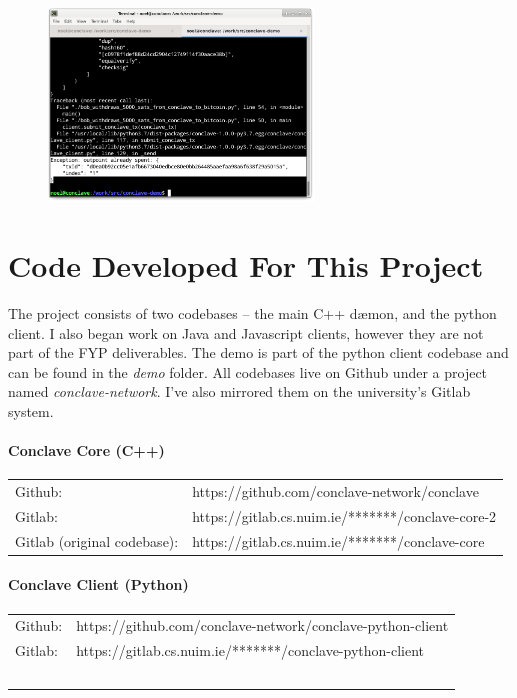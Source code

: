 \documentclass{report}
\begin{document}
\begin{appendices}
\begin{figure}[H]
\begin{minipage}{.5\textwidth}
		  \label{fig:test1}
		\end{minipage}%
		\begin{minipage}{.5\textwidth}
		  \centering
		  \includegraphics[width=200pt]{img/screenshot-4.png}
		  \label{fig:test2}
		\end{minipage}
		\end{figure}
  \clearpage
  \chapter{Code Developed For This Project}
  The project consists of two codebases – the main C++  dæmon, and the python client. I also began work on Java  and Javascript  clients, however they are not part of the FYP deliverables. The demo is part of the python client codebase and can be found in the \textit{demo}  folder. All codebases live on Github  under a project named \textit{conclave-network}. I’ve also mirrored them on the university’s Gitlab  system.
  \subsubsection{Conclave Core (C++)}
    \begin{tabular}{p{5cm}p{10cm}}
      Github: & https://github.com/conclave-network/conclave \\
      Gitlab: & https://gitlab.cs.nuim.ie/*******/conclave-core-2 \\
      Gitlab (original codebase): & https://gitlab.cs.nuim.ie/*******/conclave-core \\
    \end{tabular}
  \subsubsection{Conclave Client (Python)}
    \begin{tabular}{p{5cm}p{10cm}}
      Github: & https://github.com/conclave-network/conclave-python-client \\
      Gitlab: & https://gitlab.cs.nuim.ie/*******/conclave-python-client \\\
    \end{tabular}
  \clearpage
\end{appendices}
\printindex{}
\end{document}

